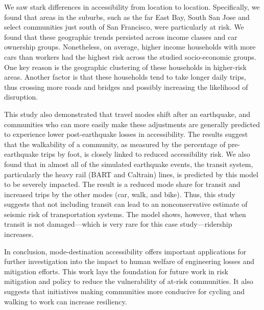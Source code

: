 
We saw stark differences in accessibility from location to location. Specifically, we found that areas in the suburbs, such as the far East Bay, South San Jose and select communities just south of San Francisco, were particularly at risk. We found that these geographic trends persisted across income classes and car ownership groups. Nonetheless, on average, higher income households with more cars than workers had the highest risk across the studied socio-economic groups. One key reason is the geographic clustering of these households in higher-risk areas. Another factor is that these households tend to take longer daily trips, thus crossing more roads and bridges and possibly increasing the likelihood of disruption.

This study also demonstrated that travel modes shift after an earthquake, and communities who can more easily make these adjustments are generally predicted to experience lower post-earthquake losses in accessibility. The results suggest that the walkability of a community, as measured by the percentage of pre-earthquake trips by foot, is closely linked to reduced accessibility risk. 
We also found that in almost all of the simulated earthquake events, the transit system, particularly the heavy rail (BART and Caltrain) lines, is predicted by this model to be severely impacted. The result is a reduced mode share for transit and increased trips by the other modes (car, walk, and bike). Thus, this study suggests that not including transit can lead to an nonconservative estimate of seismic risk of transportation systems. The model shows, however, that when transit is not damaged---which is very rare for this case study---ridership increases.

In conclusion,  mode-destination accessibility offers important applications for further investigation into the impact to human welfare of engineering losses and mitigation efforts. 
This work lays the foundation for future work in risk mitigation and policy to reduce the vulnerability of at-risk communities. It also suggests that initiatives making communities more conducive for cycling and walking to work can increase resiliency.

